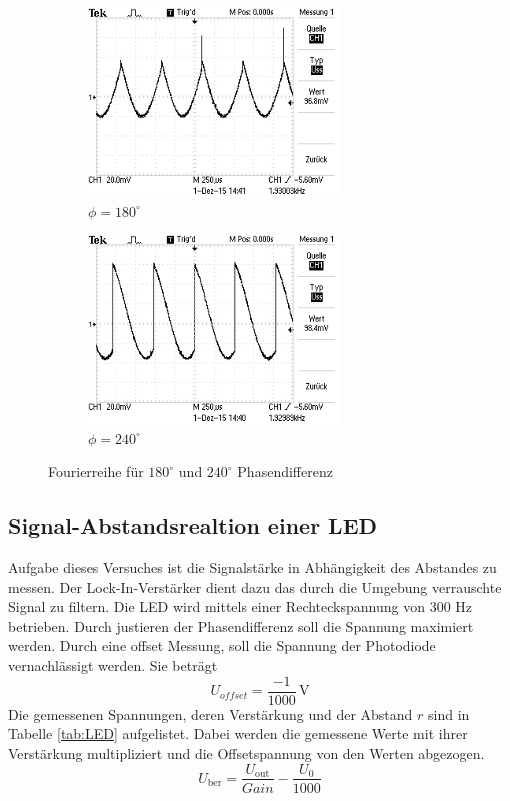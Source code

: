 \begin{figure}
  \centering
  \begin{subfigure}{0.48\textwidth}
    \centering
    \includegraphics[height=5cm]{picture/4.JPG}
    \caption{$\phi = 180^{\circ}$}
  \end{subfigure}
  \begin{subfigure}{0.48\textwidth}
    \centering
    \includegraphics[height=5cm]{picture/3.JPG}
    \caption{$\phi = 240^{\circ}$}
  \end{subfigure}
  \caption{Fourierreihe für $180^{\circ}$ und $240^\circ$ Phasendifferenz}
  \label{fig:graph2}
\end{figure}


\subsection{Signal-Abstandsrealtion einer LED}
Aufgabe dieses Versuches ist die Signalstärke in Abhängigkeit des Abstandes zu messen. Der Lock-In-Verstärker dient dazu das durch die Umgebung verrauschte Signal zu filtern. Die LED wird mittels einer Rechteckspannung von 300 Hz betrieben. Durch justieren der Phasendifferenz soll die Spannung maximiert werden. Durch eine offset Messung, soll die Spannung der Photodiode vernachlässigt werden. Sie beträgt
\begin{equation}
  U_{offset}= \frac{-1}{1000} \, \text{V}
  \label{eqn:Uoffset}
\end{equation}
Die gemessenen Spannungen, deren Verstärkung und der Abstand $r$ sind in Tabelle \ref{tab:LED} aufgelistet. Dabei werden die gemessene Werte mit ihrer Verstärkung multipliziert und  die Offsetspannung von den Werten abgezogen.
\begin{equation}
  U_{\text{ber}} = \frac{U_{\text{out}}}{Gain} - \frac{U_{0}}{1000}
  \label{eqn:Uber}
\end{equation}

